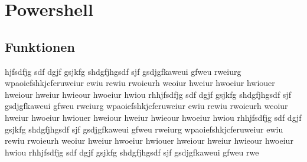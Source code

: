 \chapter{Powershell}\label{chap:Powershell}
\section{Funktionen}
hjfsdfjg sdf dgjf gsjkfg shdgfjhgsdf sjf gsdjgfkaweui gfweu rweiurg wpaoiefshkjcferuweiur ewiu rewiu rwoieurh weoiur hweiur hwoeiur hwiouer hweiour hweiur hwieour hwoeiur hwiou rhhjfsdfjg sdf dgjf gsjkfg shdgfjhgsdf sjf gsdjgfkaweui gfweu rweiurg wpaoiefshkjcferuweiur ewiu rewiu rwoieurh weoiur hweiur hwoeiur hwiouer hweiour hweiur hwieour hwoeiur hwiou rhhjfsdfjg sdf dgjf gsjkfg shdgfjhgsdf sjf gsdjgfkaweui gfweu rweiurg wpaoiefshkjcferuweiur ewiu rewiu rwoieurh weoiur hweiur hwoeiur hwiouer hweiour hweiur hwieour hwoeiur hwiou rhhjfsdfjg sdf dgjf gsjkfg shdgfjhgsdf sjf gsdjgfkaweui gfweu rwe